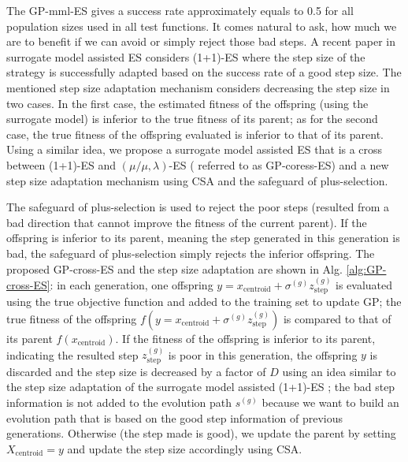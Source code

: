The GP-mml-ES gives a success rate approximately equals to 0.5 for all population sizes used in all test functions. It comes natural to ask, how much we are to benefit if we can avoid or simply reject those bad steps. A recent paper in surrogate model assisted ES considers (1+1)-ES \cite{DBLP:conf/ppsn/KayhaniA18} where the step size of the strategy is successfully adapted based on the success rate of a good step size. The mentioned step size adaptation mechanism considers decreasing the step size in two cases. In the first case, the estimated fitness of the offspring (using the surrogate model) is inferior to the true fitness of its parent; as for the second case, the true fitness of the offspring evaluated is inferior to that of its parent. Using a similar idea, we propose a surrogate model assisted ES that is a cross between (1+1)-ES and $(\mu/\mu,\lambda)$-ES ( referred to as GP-coress-ES) and a new step size adaptation mechanism using CSA and the safeguard of plus-selection. 

The safeguard of plus-selection is used to reject the poor steps (resulted from a bad direction that cannot improve the fitness of the current parent). If the offspring is inferior to its parent, meaning the step generated in this generation is bad, the safeguard of plus-selection simply rejects the inferior offspring. The proposed GP-cross-ES and the step size adaptation are shown in Alg. \ref{alg:GP-cross-ES}: in each generation, one offspring $y=x_{\text{centroid}} + \sigma^{(g)} z_{\text{step}}^{(g)}$ is evaluated using the true objective function and added to the training set to update GP; the true fitness of the offspring $f(y=x_{\text{centroid}} + \sigma^{(g)} z_{\text{step}}^{(g)})$ is compared to that of its parent $f(x_{\text{centroid}})$. If the fitness of the offspring is inferior to its parent, indicating the resulted step $z_{\text{step}}^{(g)}$ is poor in this generation, the offspring $y$ is discarded and the step size is decreased by a factor of $D$ using an idea similar to the step size adaptation of the surrogate model assisted (1+1)-ES \cite{DBLP:conf/ppsn/KayhaniA18}; the bad step information is not added to the evolution path $s^{(g)}$ because we want to build an evolution path that is based on the good step information of previous generations. Otherwise (the step made is good), we update the parent by setting $X_{\text{centroid}} = y$ and update the step size accordingly using CSA. 


